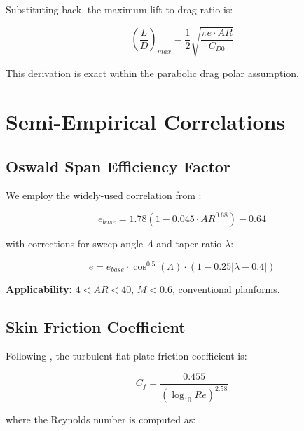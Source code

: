 \documentclass[11pt,a4paper]{article}
\begin{document}
Substituting back, the maximum lift-to-drag ratio is:

\begin{equation}
\boxed{\left(\frac{L}{D}\right)_{max} = \frac{1}{2}\sqrt{\frac{\pi e \cdot AR}{C_{D0}}}}
\label{eq:ld_max}
\end{equation}

This derivation is exact within the parabolic drag polar assumption.

\section{Semi-Empirical Correlations}

\subsection{Oswald Span Efficiency Factor}

We employ the widely-used correlation from \citet{raymer1992}:

\begin{equation}
e_{base} = 1.78(1 - 0.045 \cdot AR^{0.68}) - 0.64
\label{eq:oswald_base}
\end{equation}

with corrections for sweep angle $\Lambda$ and taper ratio $\lambda$:

\begin{equation}
e = e_{base} \cdot \cos^{0.5}(\Lambda) \cdot (1 - 0.25|\lambda - 0.4|)
\label{eq:oswald_full}
\end{equation}

\textbf{Applicability:} $4 < AR < 40$, $M < 0.6$, conventional planforms.

\subsection{Skin Friction Coefficient}

Following \citet{schlichting1979}, the turbulent flat-plate friction coefficient is:

\begin{equation}
C_f = \frac{0.455}{(\log_{10} Re)^{2.58}}
\label{eq:cf}
\end{equation}

where the Reynolds number is computed as:
\end{document}
